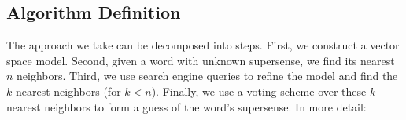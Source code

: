 \documentclass{article}
\begin{document}
\subsection{Algorithm Definition}
\label{sec:alg}


The approach we take can be decomposed into steps.
First, we construct a vector space model.
Second, given a word with unknown supersense, we find its nearest $n$ neighbors.
Third, we use search engine queries to refine the model and find the $k$-nearest neighbors (for $k< n$).
Finally, we use a voting scheme over these $k$-nearest neighbors to form a guess of the word's supersense.
In more detail:
\end{document}
